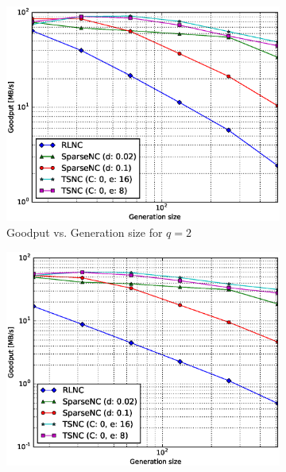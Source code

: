 \begin{figure}
    \centering
    \begin{subfigure}[b]{0.475\textwidth}
        \centering
        \includegraphics[width=1.15\textwidth]{images/06_06_2016/goodput_vs_generation_size_Rasp_v2_encoder_Binary_1600.eps}
        \caption[]%
        {{\small Goodput vs. Generation size for $q = 2$}}
        \label{fig:enc_good_rasp2_gen_gf2}
    \end{subfigure}
    \hfill
    \begin{subfigure}[b]{0.475\textwidth}
        \centering
        \includegraphics[width=1.15\textwidth]{images/06_06_2016/goodput_vs_generation_size_Rasp_v2_encoder_Binary8_1600.eps}

\end{subfigure}
\end{figure}
